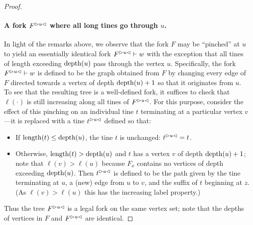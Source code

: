 \begin{proof}

  \paragraph{A fork $\pinch{u}{F}$ where all long tines go through $u$.}
    In light of the remarks above, we observe that the fork $F$ may be
    ``pinched'' at $u$ to yield an essentially identical fork
    $\pinch{u}{F} \vdash w$ with the exception that all tines of length
    exceeding $\depth(u)$ pass through the vertex $u$. Specifically, the
    fork $\pinch{u}{F} \vdash w$ is defined to be the graph obtained
    from $F$ by changing every edge of $F$ directed towards a vertex of
    depth $\depth(u) + 1$ so that it originates from $u$. To see that
    the resulting tree is a well-defined fork, it suffices to check that
    $\ell(\cdot)$ is still increasing along all tines of
    $\pinch{u}{F}$. For this purpose, consider the effect of this
    pinching on an individual tine $t$ terminating at a particular
    vertex $v$---it is replaced with a tine $\pinch{u}{t}$ defined so
    that:
    \begin{itemize}
    \item If $\length(t) \leq \depth(u)$, the tine $t$ is unchanged:
      $\pinch{u}{t} = t$.
    \item Otherwise, $\length(t) > \depth(u)$ and $t$ has a vertex $v$
      of depth $\depth(u) + 1$; note that $\ell(v) > \ell(u)$ because
      $F_x$ contains no vertices of depth exceeding $\depth(u)$. Then
      $\pinch{u}{t}$ is defined to be the path given by the tine
      terminating at $u$, a (new) edge from $u$ to $v$, and the suffix
      of $t$ beginning at $z$. (As $\ell(v) > \ell(u)$ this has the
      increasing label property.)
    \end{itemize}
    Thus the tree $\pinch{u}{F}$ is a legal fork on the same vertex set;
    note that the depths of vertices in $F$ and $\pinch{u}{F}$ are
    identical.
    

\end{proof}
